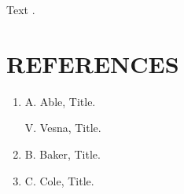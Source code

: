 \documentclass{article}
\begin{document}
Text \cite{v}.
\section*{REFERENCES}
\begin{enumerate}

\item A. Able, Title.

 V. Vesna, Title.

\item B. Baker, Title.

\item C. Cole, Title.
\end{enumerate}
\end{document}

